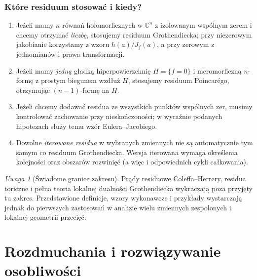 \documentclass[11pt,a4paper,openany]{report}
\numberwithin{equation}{section}
\theoremstyle{plain}
\theoremstyle{definition}
\theoremstyle{remark}
\newtheorem{uwaga}[twierdzenie]{Uwaga}
\newcommand{\C}{\mathbb C}
\begin{document}
\subsection{Które residuum stosować i kiedy?}
\begin{enumerate}[label=\arabic*)]
\item Jeżeli mamy $n$ równań holomorficznych w $\C^n$ z izolowanym
wspólnym zerem i chcemy otrzymać \emph{liczbę}, stosujemy residuum
Grothendiecka; przy niezerowym jakobianie korzystamy z wzoru
$h(a)/J_f(a)$, a przy zerowym z jednomianów i prawa transformacji.
\item Jeżeli mamy \emph{jedną} gładką hiperpowierzchnię $H=\{f=0\}$
i meromorficzną $n$-formę z prostym biegunem wzdłuż $H$,
stosujemy residuum Poincarégo, otrzymując $(n-1)$-formę na $H$.
\item Jeżeli chcemy dodawać residua ze wszystkich punktów wspólnych
zer, musimy kontrolować zachowanie przy nieskończoności;
w wyraźnie podanych hipotezach służy temu wzór Eulera--Jacobiego.
\item Dowolne \emph{iterowane residua} w wybranych zmiennych nie są
automatycznie tym samym co residuum Grothendiecka.
Wersja iterowana wymaga określenia kolejności oraz
obszarów rozwinięć (a więc i odpowiednich cykli całkowania).
\end{enumerate}

\begin{uwaga}[Świadome granice zakresu]
Prądy residuowe Coleffa--Herrery, residua toriczne i
pełna teoria lokalnej dualności Grothendiecka wykraczają
poza przyjęty tu zakres. Przedstawione definicje, wzory
wykonawcze i przykłady wystarczają jednak do pierwszych
zastosowań w analizie wielu zmiennych zespolonych
i lokalnej geometrii przecięć.
\end{uwaga}


\chapter{Rozdmuchania i rozwiązywanie osobliwości}
\label{ch:ga5-rozdmuchania}
\end{document}
